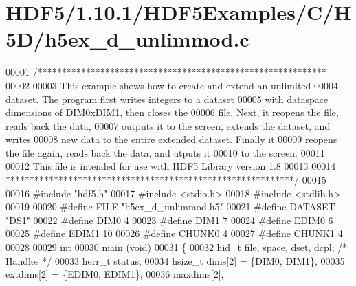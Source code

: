 \hypertarget{_h_d_f5_21_810_81_2_h_d_f5_examples_2_c_2_h5_d_2h5ex__d__unlimmod_8c_source}{}\section{H\+D\+F5/1.10.1/\+H\+D\+F5\+Examples/\+C/\+H5\+D/h5ex\+\_\+d\+\_\+unlimmod.c}
\label{_h_d_f5_21_810_81_2_h_d_f5_examples_2_c_2_h5_d_2h5ex__d__unlimmod_8c_source}

\begin{DoxyCode}
00001 \textcolor{comment}{/************************************************************}
00002 \textcolor{comment}{}
00003 \textcolor{comment}{  This example shows how to create and extend an unlimited}
00004 \textcolor{comment}{  dataset.  The program first writes integers to a dataset}
00005 \textcolor{comment}{  with dataspace dimensions of DIM0xDIM1, then closes the}
00006 \textcolor{comment}{  file.  Next, it reopens the file, reads back the data,}
00007 \textcolor{comment}{  outputs it to the screen, extends the dataset, and writes}
00008 \textcolor{comment}{  new data to the entire extended dataset.  Finally it}
00009 \textcolor{comment}{  reopens the file again, reads back the data, and utputs it}
00010 \textcolor{comment}{  to the screen.}
00011 \textcolor{comment}{}
00012 \textcolor{comment}{  This file is intended for use with HDF5 Library version 1.8}
00013 \textcolor{comment}{}
00014 \textcolor{comment}{ ************************************************************/}
00015 
00016 \textcolor{preprocessor}{#include "hdf5.h"}
00017 \textcolor{preprocessor}{#include <stdio.h>}
00018 \textcolor{preprocessor}{#include <stdlib.h>}
00019 
00020 \textcolor{preprocessor}{#define FILE            "h5ex\_d\_unlimmod.h5"}
00021 \textcolor{preprocessor}{#define DATASET         "DS1"}
00022 \textcolor{preprocessor}{#define DIM0            4}
00023 \textcolor{preprocessor}{#define DIM1            7}
00024 \textcolor{preprocessor}{#define EDIM0           6}
00025 \textcolor{preprocessor}{#define EDIM1           10}
00026 \textcolor{preprocessor}{#define CHUNK0          4}
00027 \textcolor{preprocessor}{#define CHUNK1          4}
00028 
00029 \textcolor{keywordtype}{int}
00030 main (\textcolor{keywordtype}{void})
00031 \{
00032     hid\_t           \hyperlink{structfile}{file}, space, dset, dcpl;    \textcolor{comment}{/* Handles */}
00033     herr\_t          status;
00034     hsize\_t         dims[2] = \{DIM0, DIM1\},
00035                     extdims[2] = \{EDIM0, EDIM1\},
00036                     maxdims[2],

\end{DoxyCode}
